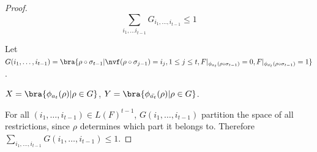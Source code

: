 \begin{proof}
    $$\sum_{i_1, \ldots i_{t-1}} G_{i_1, \ldots , i_{t-1}} \leq 1$$
    
    
    
     Let $G(i_1, \ldots , i_{t-1}) = \bra{\rho \circ \sigma_{t-1}| \nvf(\rho \circ \sigma_{j-1} ) =  i_j, 1 \leq j \leq t,  F|_{\phi_{a_t}(\rho \circ \sigma_{t-1})} = 0, F|_{\phi_{\bar{a_t}}(\rho \circ \sigma_{t-1})} = 1}$.
    
     $X = \bra{\phi_{a_t}(\rho)| \rho \in G}$,
     $Y = \bra{\phi_{\bar{a_t}}(\rho)| \rho \in G}$.
    
    
    For all $(i_1, \ldots ,i_{t-1}) \in L(F)^{t-1}$, $G(i_1, \ldots , i_{t-1})$ partition the space of all restrictions, since $\rho$ determines which part it belongs to. Therefore $\sum_{i_1, \ldots, i_{t-1}} G(i_1, \ldots , i_{t-1}) \leq 1$.  
\end{proof}
